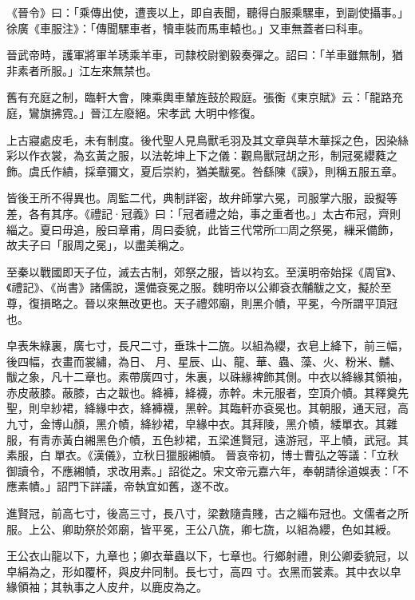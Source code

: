 \begin{pinyinscope}
 《晉令》曰：「乘傳出使，遭喪以上，即自表聞，聽得白服乘騾車，到副使攝事。」徐廣《車服注》：「傳聞騾車者，犢車裝而馬車轅也。」又車無蓋者曰科車。



 晉武帝時，護軍將軍羊琇乘羊車，司隸校尉劉毅奏彈之。詔曰：「羊車雖無制，猶非素者所服。」江左來無禁也。



 舊有充庭之制，臨軒大會，陳乘輿車輦旌鼓於殿庭。張衡《東京賦》云：「龍路充庭，鸞旗拂霓。」晉江左廢絕。宋孝武
 大明中修復。



 上古寢處皮毛，未有制度。後代聖人見鳥獸毛羽及其文章與草木華採之色，因染絲彩以作衣裳，為玄黃之服，以法乾坤上下之儀：觀鳥獸冠胡之形，制冠冕纓蕤之飾。虞氏作繢，採章彌文，夏后崇約，猶美黻冕。咎繇陳《謨》，則稱五服五章。



 皆後王所不得異也。周監二代，典制詳密，故弁師掌六冕，司服掌六服，設擬等差，各有其序。《禮記·冠義》曰：「冠者禮之始，事之重者也。」太古布冠，齊則
 緇之。夏曰毋追，殷曰章甫，周曰委貌，此皆三代常所□□周之祭冕，繅采備飾，故夫子曰「服周之冕」，以盡美稱之。



 至秦以戰國即天子位，滅去古制，郊祭之服，皆以袀玄。至漢明帝始採《周官》、《禮記》、《尚書》諸儒說，還備袞冕之服。魏明帝以公卿袞衣黼黻之文，擬於至尊，復損略之。晉以來無改更也。天子禮郊廟，則黑介幘，平冕，今所謂平頂冠也。



 皁表朱綠裏，廣七寸，長尺二寸，垂珠十二旒。以組為纓，衣皂上絳下，前三幅，後四幅，衣畫而裳繡，為日、
 月、星辰、山、龍、華、蟲、藻、火、粉米、黼、黻之象，凡十二章也。素帶廣四寸，朱裏，以硃緣裨飾其側。中衣以絳緣其領袖，赤皮蔽膝。蔽膝，古之韍也。絳褲，絳襪，赤幹。未元服者，空頂介幘。其釋奠先聖，則皁紗裙，絳緣中衣，絳褲襪，黑幹。其臨軒亦袞冕也。其朝服，通天冠，高九寸，金博山顏，黑介幘，絳紗裙，皁緣中衣。其拜陵，黑介幘，緌單衣。其雜服，有青赤黃白緗黑色介幘，五色紗裙，五梁進賢冠，遠游冠，平上幘，武冠。其素服，白𢂿單衣。《漢儀》，立秋日獵服緗幘。
 晉哀帝初，博士曹弘之等議：「立秋御讀令，不應緗幘，求改用素。」詔從之。宋文帝元嘉六年，奉朝請徐道娛表：「不應素幘。」詔門下詳議，帝執宜如舊，遂不改。



 進賢冠，前高七寸，後高三寸，長八寸，梁數隨貴賤，古之緇布冠也。文儒者之所服。上公、卿助祭於郊廟，皆平冕，王公八旒，卿七旒，以組為纓，色如其綬。



 王公衣山龍以下，九章也；卿衣華蟲以下，七章也。行鄉射禮，則公卿委貌冠，以皁絹為之，形如覆杯，與皮弁同制。長七寸，高四
 寸。衣黑而裳素。其中衣以皁緣領袖；其執事之人皮弁，以鹿皮為之。




\end{pinyinscope}
